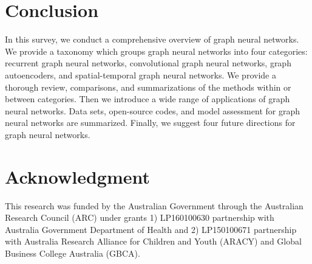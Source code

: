 	
	



	
	
	\section{Conclusion}\label{sec:conclusion}
	In this survey, we conduct a comprehensive overview of graph neural networks. We provide a taxonomy which groups graph neural networks into four categories: recurrent graph neural networks, convolutional graph neural networks, graph autoencoders, and spatial-temporal graph neural networks. We provide a thorough review, comparisons, and summarizations of the methods within or between categories.   Then we introduce a wide range of applications of graph neural networks. Data sets, open-source codes, and model assessment for graph neural networks are summarized. Finally, we suggest four future directions for graph neural networks.
	
	
	
 	\section*{Acknowledgment}	
 	This research was funded by the Australian Government through the Australian Research Council (ARC) under grants 1) LP160100630 partnership with Australia Government Department of Health and 2) LP150100671 partnership with Australia Research Alliance for Children and Youth (ARACY) and Global Business College Australia (GBCA). %
	

